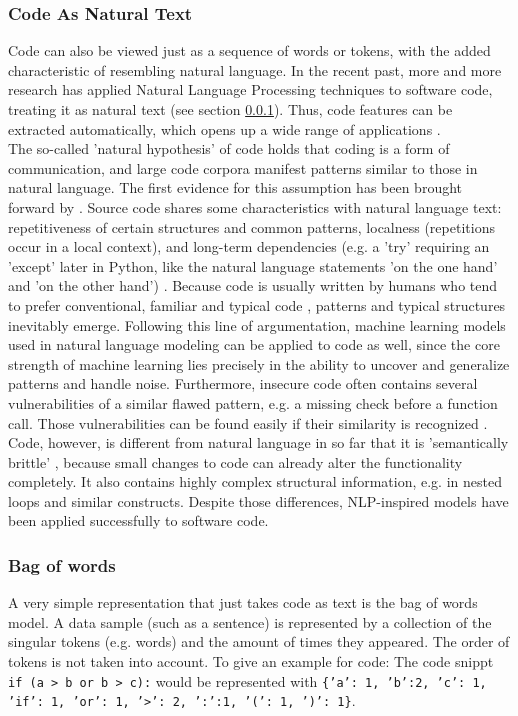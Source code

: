 \documentclass[
	a4paper,
	pagesize,
	pdftex,
	12pt,
	twoside, %
	BCOR=5mm, %
	ngerman,
	fleqn,
	final,
	]{scrartcl}
\begin{document}
\subsubsection{Code As Natural Text}\label{Natural-Hypothesis}\label{Semantically-Brittle}
Code can also be viewed just as a sequence of words or tokens, with the added characteristic of resembling natural language. In the recent past, more and more research has applied Natural Language Processing techniques to software code, treating it as natural text (see section \ref{Natural-Hypothesis}). Thus, code features can be extracted automatically, which opens up a wide range of applications \cite{Dam.2017}.\\
The so-called 'natural hypothesis' of code holds that coding is a form of communication, and large code corpora manifest patterns similar to those in natural language. The first evidence for this assumption has been brought forward by \cite{Hindle.2012}.
Source code shares some characteristics with natural language text: repetitiveness of certain structures and common patterns, localness (repetitions occur in a local context), and long-term dependencies (e.g. a 'try' requiring an 'except' later in Python, like the natural language statements 'on the one hand' and 'on the other hand') \cite{Dam.2016}.
Because code is usually written by humans who tend to prefer conventional, familiar and typical code \cite{Allamanis.2018}, patterns and typical structures inevitably emerge. Following this line of argumentation, machine learning models used in natural language modeling can be applied to code as well, since the core strength of machine learning lies precisely in the ability to uncover and generalize patterns and handle noise. Furthermore, insecure code often contains several vulnerabilities of a similar flawed pattern, e.g. a missing check before a function call. Those vulnerabilities can be found easily if their similarity is recognized \cite{Yamaguchi.2012}. 
Code, however, is different from natural language in so far that it is 'semantically brittle' \cite{Allamanis.2018}, because small changes to code can already alter the functionality completely. It also contains highly complex structural information, e.g. in nested loops and similar constructs. Despite those differences, NLP-inspired models have been applied successfully to software code.

\subsubsection{Bag of words}
A very simple representation that just takes code as text is the bag of words model. A data sample (such as a sentence) is represented by a collection of the singular tokens (e.g. words) and the amount of times they appeared. The order of tokens is not taken into account. To give an example for code: The code snippt \texttt{if (a > b or b > c):} would be represented with \texttt{\{'a': 1, 'b':2, 'c': 1, 'if': 1, 'or': 1, '>': 2, ':':1, '(': 1, ')': 1\}}.
\end{document}
